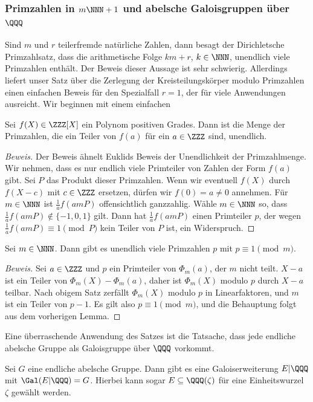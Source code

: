\documentclass[12pt,a4paper,twoside]{article}
\begin{document}
\subsubsection{Primzahlen in $m\NNN+1$ und abelsche Galoisgruppen \"uber
  $\QQQ$} Sind $m$ und $r$ teilerfremde nat\"urliche Zahlen, dann besagt der
Dirichletsche Primzahlsatz, dass die arithmetische Folge $km+r$, $k\in\NNN$,
unendlich viele Primzahlen enth\"alt. Der Beweis dieser Aussage ist sehr
schwierig. Allerdings liefert unser Satz \"uber die Zerlegung der
Kreisteilungsk\"orper modulo Primzahlen einen einfachen Beweis f\"ur den
Spezialfall $r=1$, der f\"ur viele Anwendungen ausreicht.
Wir beginnen mit einem einfachen
\begin{Lemma}
  Sei $f(X)\in\ZZZ[X]$ ein Polynom positiven Grades. Dann ist die Menge der
  Primzahlen, die ein Teiler von $f(a)$ f\"ur ein $a\in\ZZZ$ sind, unendlich.
\end{Lemma}
\begin{proof}[Beweis]
  Der Beweis \"ahnelt Euklids Beweis der Unendlichkeit der Primzahlmenge. Wir
  nehmen, dass es nur endlich viele Primteiler von Zahlen der Form $f(a)$
  gibt. Sei $P$ das Produkt dieser Primzahlen. Wenn wir eventuell $f(X)$ durch
  $f(X-c)$ mit $c\in\ZZZ$ ersetzen, d\"urfen wir $f(0)=a\ne0$ annehmen.  F\"ur
  $m\in\NNN$ ist $\frac{1}{a}f(amP)$ offensichtlich ganzzahlig. W\"ahle
  $m\in\NNN$ so, dass $\frac{1}{a}f(amP)\notin\{-1,0,1\}$ gilt. Dann hat
  $\frac{1}{a}f(amP)$ einen Primteiler $p$, der wegen
  $\frac{1}{a}f(amP)\equiv1\pmod{P}$ kein Teiler von $P$ ist, ein Widerspruch.
\end{proof}
\begin{Satz}
  Sei $m\in\NNN$. Dann gibt es unendlich viele Primzahlen $p$ mit
  $p\equiv1\pmod{m}$.
\end{Satz}
\begin{proof}[Beweis]
  Sei $a\in\ZZZ$ und $p$ ein Primteiler von $\Phi_m(a)$, der $m$ nicht teilt.
  $X-a$ ist ein Teiler von $\Phi_m(X)-\Phi_m(a)$, daher ist $\Phi_m(X)$ modulo
  $p$ durch $X-a$ teilbar. Nach obigem Satz zerf\"allt $\Phi_m(X)$ modulo $p$
  in Linearfaktoren, und $m$ ist ein Teiler von $p-1$. Es gilt also
  $p\equiv1\pmod{m}$, und die Behauptung folgt aus dem vorherigen Lemma.
\end{proof}
Eine \"uberraschende Anwendung des Satzes ist die Tatsache, dass jede endliche
abelsche Gruppe als Galoisgruppe \"uber $\QQQ$ vorkommt.
\begin{Satz}
  Sei $G$ eine endliche abelsche Gruppe. Dann gibt es eine Galoiserweiterung
  $E|\QQQ$ mit $\Gal(E|\QQQ)=G$. Hierbei kann sogar $E\subseteq\QQQ(\zeta)$
  f\"ur eine Einheitswurzel $\zeta$ gew\"ahlt werden.
\end{Satz}
\end{document}
